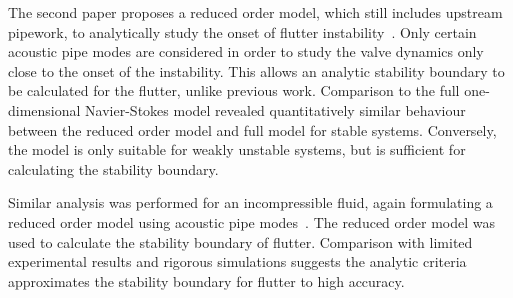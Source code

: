 The second paper proposes a reduced order model, which still includes upstream pipework, to analytically study the onset of flutter instability~\cite{Hos2015DynamicModelling}. Only certain acoustic pipe modes are considered in order to study the valve dynamics only close to the onset of the instability. This allows an analytic stability boundary to be calculated for the flutter, unlike previous work.
Comparison to the full one-dimensional Navier-Stokes model revealed quantitatively similar behaviour between the reduced order model and full model for stable systems. Conversely, the model is only suitable for weakly unstable systems, but is sufficient for calculating the stability boundary.

\newpage
Similar analysis was performed for an incompressible fluid, again formulating a reduced order model using acoustic pipe modes~\cite{Hos2016DynamicService}. The reduced order model was used to calculate the stability boundary of flutter. Comparison with limited experimental results and rigorous simulations suggests the analytic criteria approximates the stability boundary for flutter to high accuracy.

